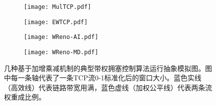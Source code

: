 \documentclass[winfonts]{njuthesis}
\begin{document}
\begin{figure}[ht!]
  \centering
  \begin{subfigure}{.4\textwidth}
    \centering
      \texttt{[image: MulTCP.pdf]}
      \label{fig:MulTCP}
  \end{subfigure}
  \hspace{1em}
  \begin{subfigure}{.4\textwidth}
    \centering
      \texttt{[image: EWTCP.pdf]}
      \label{fig:EWTCP}
  \end{subfigure}
  \begin{subfigure}{.4\textwidth}
    \centering
      \texttt{[image: WReno-AI.pdf]}
      \label{fig:WReno-AI}
  \end{subfigure}
  \hspace{1em}
  \begin{subfigure}{.4\textwidth}
    \centering
      \texttt{[image: WReno-MD.pdf]}
      \label{fig:WReno-MD}
  \end{subfigure}
  \caption{几种基于加增乘减机制的典型带权拥塞控制算法运行抽象模拟图。图中每一条轴代表了一条TCP流0-1标准化后的窗口大小。蓝色实线（高效线）代表链路带宽用满，蓝色虚线（加权公平线）代表两条流权重成比例。}
\label{fig:AIMD}
\end{figure}
\end{document}
